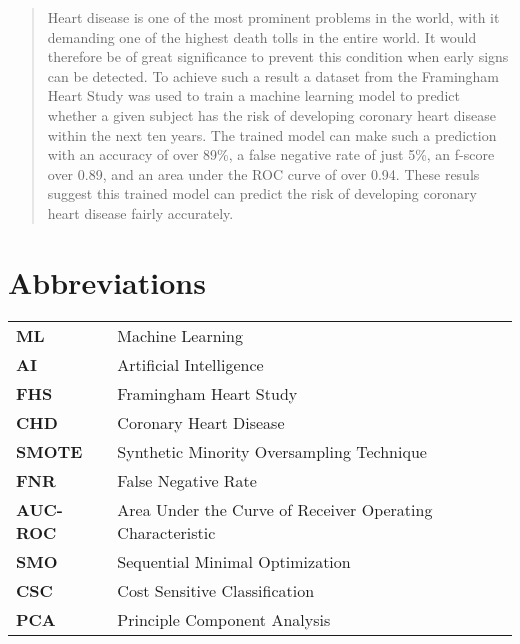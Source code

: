 \newpage
{}

\begin{abstract}

Heart disease is one of the most prominent problems in the world, with it demanding one of the highest death tolls in the entire world. It would therefore be of great significance to prevent this condition when early signs can be detected. To achieve such a result a dataset from the Framingham Heart Study was used to train a machine learning model to predict whether a given subject has the risk of developing coronary heart disease within the next ten years. The trained model can make such a prediction with an accuracy of over 89\%, a false negative rate of just 5\%, an f-score over 0.89, and an area under the ROC curve of over 0.94. These resuls suggest this trained model can predict the risk of developing coronary heart disease fairly accurately.

\end{abstract}
\newpage

\section*{Abbreviations}

\begin{tabular}{ll}
\textbf{ML}       & Machine Learning \\
\textbf{AI}       & Artificial Intelligence \\
\textbf{FHS}      & Framingham Heart Study \\
\textbf{CHD}      & Coronary Heart Disease \\
\textbf{SMOTE}    & Synthetic Minority Oversampling Technique \\
\textbf{FNR}      & False Negative Rate \\
\textbf{AUC-ROC}  & Area Under the Curve of Receiver Operating Characteristic \\
\textbf{SMO}      & Sequential Minimal Optimization \\
\textbf{CSC}      & Cost Sensitive Classification \\
\textbf{PCA}      & Principle Component Analysis \\
\end{tabular}


\listoffigures 
{}
\listoftables

\newpage

\tableofcontents

\newpage
{}
